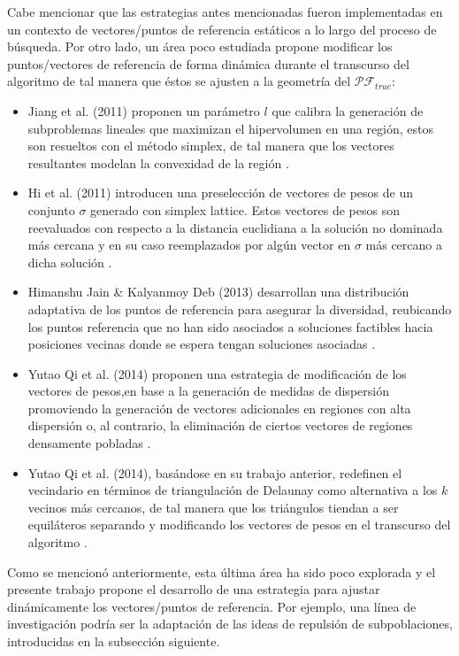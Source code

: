 \documentclass[letterpaper,10pt]{article}
\begin{document}
Cabe mencionar que las estrategias antes mencionadas fueron implementadas en un contexto de vectores/puntos de referencia estáticos a lo largo del proceso de búsqueda. Por otro lado, un área poco estudiada propone modificar los puntos/vectores de referencia de forma dinámica durante el transcurso del algoritmo de tal manera que éstos se ajusten a la geometría del $\mathcal{PF}_{true}$:
\begin{itemize}
  \item Jiang et al. (2011) proponen un parámetro $l$ que calibra la generación de subproblemas lineales que maximizan el hipervolumen en una región, estos son resueltos con el método simplex, de tal manera que los vectores resultantes modelan la convexidad de la región \cite{jiang2011multiobjective}.
  \item Hi et al. (2011) introducen una preselección de vectores de pesos de un conjunto $\sigma$  generado con simplex lattice. Estos vectores de pesos son reevaluados con respecto  a la distancia euclidiana  a la solución no dominada más cercana y en su caso reemplazados por algún vector en $\sigma$ más cercano a dicha solución \cite{li2011adaptive}.
  \item Himanshu Jain \& Kalyanmoy Deb (2013) desarrollan una distribución adaptativa de los puntos de referencia para asegurar la diversidad, reubicando los puntos referencia que no han sido asociados a soluciones factibles hacia posiciones vecinas donde se espera tengan soluciones asociadas \cite{jain2013improved}.
  \item Yutao Qi et al. (2014) proponen una estrategia de modificación de los vectores de pesos,en base a la generación de medidas de dispersión promoviendo la generación de vectores adicionales en regiones con alta dispersión o, al contrario, la eliminación de ciertos vectores de regiones densamente pobladas \cite{doi:10.1162/EVCOa00109}.
  \item Yutao Qi et al. (2014), basándose en su trabajo anterior, redefinen el vecindario en términos de triangulación de Delaunay como alternativa a los $k$ vecinos más cercanos, de tal manera que los triángulos tiendan a ser equiláteros separando y modificando los vectores de pesos en el transcurso del algoritmo \cite{qi2014moea}.
\end{itemize}

Como se mencionó anteriormente, esta última área ha sido poco explorada y el presente trabajo propone el desarrollo de una estrategia para ajustar dinámicamente los vectores/puntos de referencia. Por ejemplo, una línea de investigación podría ser la adaptación de las ideas de repulsión de subpoblaciones, introducidas en la subsección siguiente.
\end{document}
